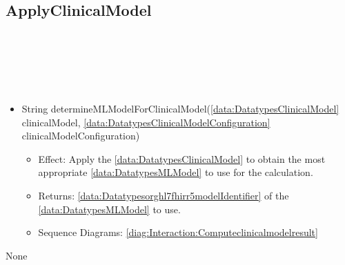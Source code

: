   \subsection{ApplyClinicalModel}\label{int:InterfacesApplyClinicalModel}
    \begin{description}
      \item[Provided by:] \iconcomponent{}~
      \item[Required by:] \iconcomponent{}~ 
      \item[Operations:] ~
    \begin{itemize}[noitemsep,nolistsep,leftmargin=-.25cm]
      \item \textsf{String determineMLModelForClinicalModel(\ref{data:DatatypesClinicalModel} clinicalModel, \ref{data:DatatypesClinicalModelConfiguration} clinicalModelConfiguration)}
        \begin{itemize}[noitemsep,nolistsep]
           \item Effect: Apply the \ref{data:DatatypesClinicalModel} to obtain the most appropriate \ref{data:DatatypesMLModel} to use for the calculation. 
           \item Returns: \ref{data:Datatypesorghl7fhirr5modelIdentifier} of the \ref{data:DatatypesMLModel} to use.
           \item Sequence Diagrams: \cref{diag:Interaction:Computeclinicalmodelresult}
        \end{itemize}
    \end{itemize}
      \item[Diagrams:] None
    \end{description}

